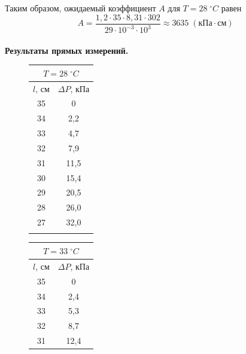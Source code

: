\documentclass[a4paper]{article}
\begin{document}
	Таким образом, ожидаемый коэффициент $A$ для $T=28\;^\circ C$ равен
	$$ A=\frac{1,2\cdot35\cdot8,31\cdot302}{29\cdot10^{-3}\cdot10^3}\approx3635\;\left( \mbox{кПа}\cdot\mbox{см}\right) $$\\
	
	{\parindent=0pt\textbf{Результаты прямых измерений.}}\\
	
	\begin{figure}[htb]		
		\begin{minipage}[b]{0.3\textwidth}
			
					\begin{tabular}{c|c}
					\multicolumn{2}{c}{$T=28\;^{\circ} C$}\\
					\hline
					$l$, см&$\Delta P$, кПа  \\
					\hline
					35&  0\\
					
					34& 2,2 \\
					
					33&  4,7\\
					
					32&  7,9\\
					
					31&11,5  \\
					
					30& 15,4 \\
					
					29&  20,5\\
					
					28&  26,0\\
					
					27&32,0\\
					\multicolumn{2}{c}{}
				\end{tabular}
		\end{minipage}
	\hfil
	\begin{minipage}[b]{0.3\textwidth}
		\begin{tabular}{c|c}
			\multicolumn{2}{c}{$T=33\;^{\circ} C$}\\
			\hline
			$l$, см&$\Delta P$, кПа  \\
			\hline
			35&  0\\
			
			34& 2,4 \\
			
			33&  5,3\\
			
			32&  8,7\\
			
			31&12,4  \\
			

\end{tabular}
\end{minipage}
\end{figure}
\end{document}
